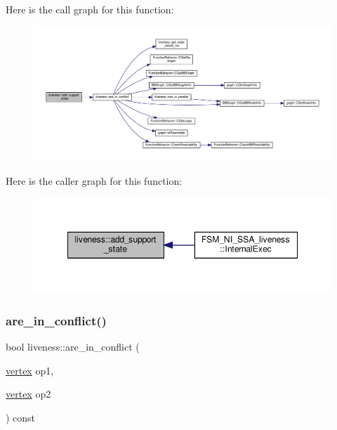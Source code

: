 Here is the call graph for this function\+:
\nopagebreak
\begin{figure}[H]
\begin{center}
\leavevmode
\includegraphics[width=350pt]{d3/d1f/classliveness_a90b74351a91f309c677f5de8692c02ef_cgraph}
\end{center}
\end{figure}
Here is the caller graph for this function\+:
\nopagebreak
\begin{figure}[H]
\begin{center}
\leavevmode
\includegraphics[width=348pt]{d3/d1f/classliveness_a90b74351a91f309c677f5de8692c02ef_icgraph}
\end{center}
\end{figure}
\mbox{\label{classliveness_a7ada63832c3f09f5e9ab213ebb6ebacf}} 
\subsubsection{\texorpdfstring{are\+\_\+in\+\_\+conflict()}{are\_in\_conflict()}}
{\footnotesize\ttfamily bool liveness\+::are\+\_\+in\+\_\+conflict (\begin{DoxyParamCaption}\item[{\hyperlink{graph_8hpp_abefdcf0544e601805af44eca032cca14}{vertex}}]{op1,  }\item[{\hyperlink{graph_8hpp_abefdcf0544e601805af44eca032cca14}{vertex}}]{op2 }\end{DoxyParamCaption}) const}



